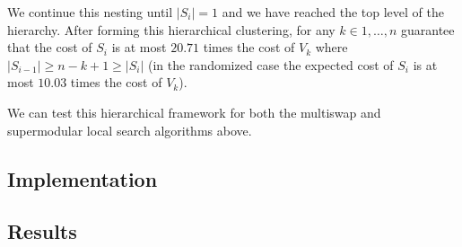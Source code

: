 \documentclass{article}
\begin{document}
We continue this nesting until $|S_i| = 1$ and we have reached the top level of the hierarchy. After forming this hierarchical clustering, for any $k \in 1, \ldots, n$ \cite{Lin} guarantee that the cost of $S_i$ is at most $20.71$ times the cost of $V_k$ where $|S_{i-1}| \geq n-k+1 \geq |S_{i}|$ (in the randomized case the expected cost of $S_i$ is at most $10.03$ times the cost of $V_k$).

We can test this hierarchical framework for both the multiswap and supermodular local search algorithms above. 

\subsection{Implementation}

\subsection{Results}

\
\label{submission}




\end{document}
